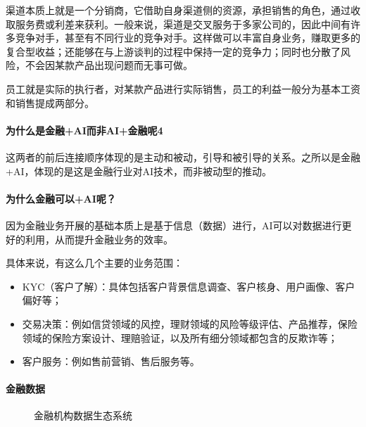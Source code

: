 \documentclass[letterpaper,10pt,english]{sphinxmanual}
\begin{document}
渠道本质上就是一个分销商，它借助自身渠道侧的资源，承担销售的角色，通过收取服务费或利差来获利。一般来说，渠道是交叉服务于多家公司的，因此中间有许多竞争对手，甚至有不同行业的竞争对手。这样做可以丰富自身业务，赚取更多的复合型收益；还能够在与上游谈判的过程中保持一定的竞争力；同时也分散了风险，不会因某款产品出现问题而无事可做。

员工就是实际的执行者，对某款产品进行实际销售，员工的利益一般分为基本工资和销售提成两部分。


\paragraph{为什么是金融+AI而非AI+金融呢4\sphinxfootnotemark[753]}
\label{\detokenize{chapter_project/AI_Finance:aiai-4}}%
\begin{footnotetext}[753]\sphinxAtStartFootnote
{}
%
\end{footnotetext}\ignorespaces 
这两者的前后连接顺序体现的是主动和被动，引导和被引导的关系。之所以是金融+AI，体现的是这是金融行业对AI技术，而非被动型的推动。


\paragraph{为什么金融可以+AI呢？}
\label{\detokenize{chapter_project/AI_Finance:id7}}
因为金融业务开展的基础本质上是基于信息（数据）进行，AI可以对数据进行更好的利用，从而提升金融业务的效率。

具体来说，有这么几个主要的业务范围：
\begin{itemize}
\item {} 
KYC（客户了解）：具体包括客户背景信息调查、客户核身、用户画像、客户偏好等；

\item {} 
交易决策：例如信贷领域的风控，理财领域的风险等级评估、产品推荐，保险领域的保险方案设计、理赔验证，以及所有细分领域都包含的反欺诈等；

\item {} 
客户服务：例如售前营销、售后服务等。

\end{itemize}


\paragraph{金融数据}
\label{\detokenize{chapter_project/AI_Finance:id8}}
\begin{figure}[H]
\centering
\capstart

\noindent{}
\caption{金融机构数据生态系统}\label{\detokenize{chapter_project/AI_Finance:id34}}\end{figure}
\end{document}
